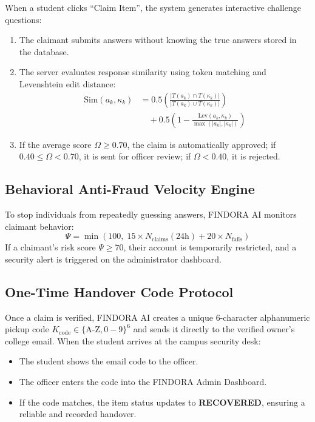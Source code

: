 \documentclass[conference]{IEEEtran}
\begin{document}
When a student clicks ``Claim Item'', the system generates interactive challenge questions:
\begin{enumerate}
    \item The claimant submits answers without knowing the true answers stored in the database.
    \item The server evaluates response similarity using token matching and Levenshtein edit distance:
    \begin{align}
        \text{Sim}(a_k, \kappa_k) &= 0.5 \left(\frac{|T(a_k) \cap T(\kappa_k)|}{|T(a_k) \cup T(\kappa_k)|}\right) \nonumber \\
        &\quad + 0.5 \left(1 - \frac{\text{Lev}(a_k, \kappa_k)}{\max(|a_k|, |\kappa_k|)}\right)
    \end{align}
    \item If the average score $\Omega \ge 0.70$, the claim is automatically approved; if $0.40 \le \Omega < 0.70$, it is sent for officer review; if $\Omega < 0.40$, it is rejected.
\end{enumerate}

\subsection{Behavioral Anti-Fraud Velocity Engine}
To stop individuals from repeatedly guessing answers, FINDORA AI monitors claimant behavior:
\begin{equation}
    \Psi = \min\left(100, \; 15 \times N_{\text{claims}}(24\text{h}) + 20 \times N_{\text{fails}}\right)
\end{equation}
If a claimant's risk score $\Psi \ge 70$, their account is temporarily restricted, and a security alert is triggered on the administrator dashboard.

\subsection{One-Time Handover Code Protocol}
Once a claim is verified, FINDORA AI creates a unique 6-character alphanumeric pickup code $K_{\text{code}} \in \{\text{A-Z}, 0-9\}^6$ and sends it directly to the verified owner's college email. When the student arrives at the campus security desk:
\begin{itemize}
    \item The student shows the email code to the officer.
    \item The officer enters the code into the FINDORA Admin Dashboard.
    \item If the code matches, the item status updates to \textbf{RECOVERED}, ensuring a reliable and recorded handover.
\end{itemize}
\end{document}
